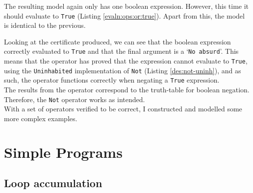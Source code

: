         The resulting \Idris model again only has one boolean expression. However, this time it should evaluate to \texttt{True} (Listing \ref{evaln:ops:or:true}). Apart from this, the model is identical to the previous.
        
        
        Looking at the certificate produced, we can see that the boolean expression correctly evaluated to \texttt{True} and that the final argument is a `\texttt{No absurd}'. This means that the operator has proved that the expression cannot evaluate to \texttt{True}, using the \texttt{Uninhabited} implementation of \texttt{Not} (Listing \ref{des:not-uninh}), and as such, the operator functions correctly when negating a \texttt{True} expression.
        \\
        
        The results from the operator correspond to the truth-table for boolean negation. Therefore, the \texttt{Not} operator works as intended.
        \\
        
        With a set of operators verified to be correct, I constructed and modelled some more complex examples.

\newpage


\section{Simple Programs}\label{evaln:progs}
    \subsection{Loop accumulation}
        
        
        
